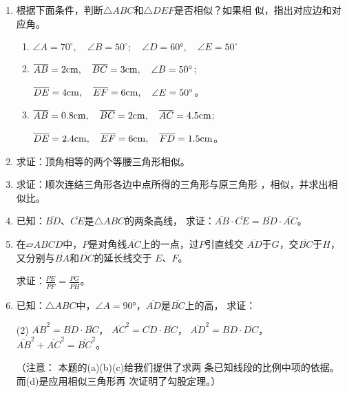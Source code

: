 \begin{Practice}
\begin{enumerate}
    \item 根据下面条件，判断$\triangle ABC$和$\triangle DEF$是否相似？如果相
    似，指出对应边和对应角。
\begin{enumerate}
    \item $\angle A=70^{\circ},\quad \angle B=50^{\circ};\quad \angle D=\ang{60},\quad \angle E=50^{\circ}$
    \item $\overline{AB}=2{\rm cm},\quad \overline{BC}=3{\rm cm},\quad \angle B=50^{\circ}$; 
    
    $\overline{DE}=4{\rm cm},\quad \overline{EF}=6{\rm cm},\quad \angle E=50^{\circ}$。
    \item $\overline{AB}=0.8{\rm cm},\quad \overline{BC}=2{\rm cm},\quad \overline{AC}=4.5{\rm cm}$; 
    
    $\overline{DE}=2.4{\rm cm},\quad \overline{EF}=6{\rm cm},\quad \overline{FD}=1.5{\rm cm}$。
\end{enumerate}

    \item 求证：顶角相等的两个等腰三角形相似。
    \item 求证：顺次连结三角形各边中点所得的三角形与原三角形
    ，相似，并求出相似比。
    \item 已知：$\overline{BD}$、$\overline{CE}$是$\triangle ABC$的两条高线，
    求证：$\overline{AB}\cdot \overline{CE}=\overline{BD}\cdot \overline{AC}$。

\item 在$\parallelogram{ABCD}$中，$P$是对角线$\overline{AC}$上的一点，过$P$引直线交
$\overline{AD}$于$G$，交$\overline{BC}$于$H$，又分别与$\overline{BA}$和$\overline{DC}$的延长线交于
$E$、$F$。

求证：$\frac{\overline{PE}}{\overline{PF}}=\frac{\overline{PG}}{\overline{PH}}$。

\item 已知：$\triangle ABC$中，$\angle A=\ang{90}$，$\overline{AD}$是$\overline{BC}$上的高，
求证：
\begin{tasks}(2)
    \task $\overline{AB}^2=\overline{BD}\cdot \overline{BC}$， 
    \task $\overline{AC}^2=\overline{CD}\cdot \overline{BC}$，
    \task $\overline{AD}^2=\overline{BD}\cdot \overline{DC}$，
    \task $\overline{AB}^2+\overline{AC}^2=\overline{BC}^2$。
\end{tasks}
（注意： 本题的(a)(b)(c)给我们提供了求两
条已知线段的比例中项的依据。而(d)是应用相似三角形再
次证明了勾股定理。）
\end{enumerate}
\end{Practice}

